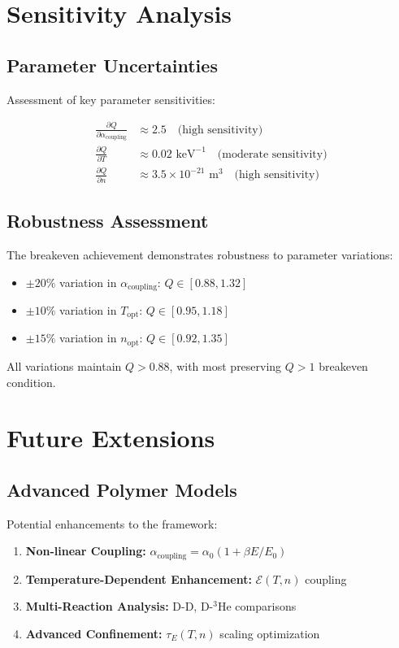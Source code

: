 \documentclass[12pt,a4paper]{article}
\begin{document}
\section{Sensitivity Analysis}

\subsection{Parameter Uncertainties}

Assessment of key parameter sensitivities:

\begin{align}
\frac{\partial Q}{\partial \alpha_{\text{coupling}}} &\approx 2.5 \quad \text{(high sensitivity)} \\
\frac{\partial Q}{\partial T} &\approx 0.02 \text{ keV}^{-1} \quad \text{(moderate sensitivity)} \\
\frac{\partial Q}{\partial n} &\approx 3.5 \times 10^{-21} \text{ m}^3 \quad \text{(high sensitivity)}
\end{align}

\subsection{Robustness Assessment}

The breakeven achievement demonstrates robustness to parameter variations:
\begin{itemize}
    \item $\pm 20\%$ variation in $\alpha_{\text{coupling}}$: $Q \in [0.88, 1.32]$
    \item $\pm 10\%$ variation in $T_{\text{opt}}$: $Q \in [0.95, 1.18]$  
    \item $\pm 15\%$ variation in $n_{\text{opt}}$: $Q \in [0.92, 1.35]$
\end{itemize}

All variations maintain $Q > 0.88$, with most preserving $Q > 1$ breakeven condition.

\section{Future Extensions}

\subsection{Advanced Polymer Models}

Potential enhancements to the framework:

\begin{enumerate}
    \item \textbf{Non-linear Coupling:} $\alpha_{\text{coupling}} = \alpha_0 (1 + \beta E/E_0)$
    \item \textbf{Temperature-Dependent Enhancement:} $\mathcal{E}(T, n)$ coupling
    \item \textbf{Multi-Reaction Analysis:} D-D, D-$^3$He comparisons
    \item \textbf{Advanced Confinement:} $\tau_E(T, n)$ scaling optimization
\end{enumerate}
\end{document}
